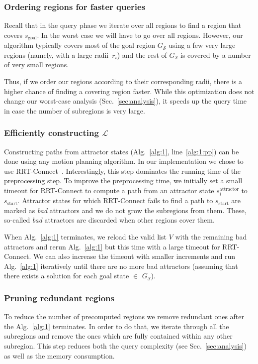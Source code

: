 \documentclass[letterpaper]{article} %
\newcommand{\calL}{\ensuremath{\mathcal{L}}\xspace}
\newcommand{\calS}{\ensuremath{\mathcal{S}}\xspace}
\newcommand{\sAttract}{\ensuremath{s^{\text{attractor}}_i}\xspace}
\newcommand{\sStart}{\ensuremath{s_{\text{start}}\xspace}}
\newcommand{\sGoal}{\ensuremath{s_{\text{goal}}\xspace}}
\begin{document}
\subsubsection{Ordering regions for faster queries}
Recall that in the query phase we iterate over all regions to find a region that covers \sGoal. 
In the worst case we will have to go over all regions.
However,  our algorithm typically covers most of the goal region $G_\calS$ using a few very large regions (namely, with a large radii~$r_i$) and the rest of $G_\calS$ is covered by a number of very small regions.

Thus, if we order our regions according to their corresponding radii, there is a higher chance of finding a covering region faster. While this optimization does not change our worst-case analysis (Sec.~\ref{sec:analysis}), it speeds up the query time in case the number of subregions is very large.

\subsubsection{Efficiently constructing $\calL$}
Constructing paths from attractor states (Alg.~\ref{alg:1}, line~\ref{alg:1:pp}) can be done using any motion planning algorithm.
In our implementation we chose to use \textsf{RRT-Connect}~\cite{KL00}.
Interestingly, this step dominates the running time of the preprocessing step.
%
To improve the preprocessing time, we initially set a small timeout for \textsf{RRT-Connect} to compute a path from an attractor state $\sAttract$ to $\sStart$.
Attractor states for which \textsf{RRT-Connect} fails to find a path to $\sStart$ are marked as \textit{bad} attractors and we do not grow the subregions from them. 
These, so-called \textit{bad} attractors are discarded when other regions cover them.

When Alg.~\ref{alg:1} terminates, we reload the valid list $V$ with the remaining bad attractors and rerun Alg.~\ref{alg:1} but this time with a large timeout for \textsf{RRT-Connect}. 
%
We can also increase the timeout with smaller increments and run Alg.~\ref{alg:1} iteratively until there are no more bad attractors (assuming that there exists a solution for each goal state $\in$ $G_\calS$).


\subsubsection{Pruning redundant regions}
To reduce the number of precomputed regions we remove redundant ones after the Alg.~\ref{alg:1} terminates. 
In order to do that, we iterate through all the subregions and remove the ones which are fully contained within any other subregion. 
This step reduces both the query complexity (see Sec.~\ref{sec:analysis}) as well as the memory consumption.
\end{document}
